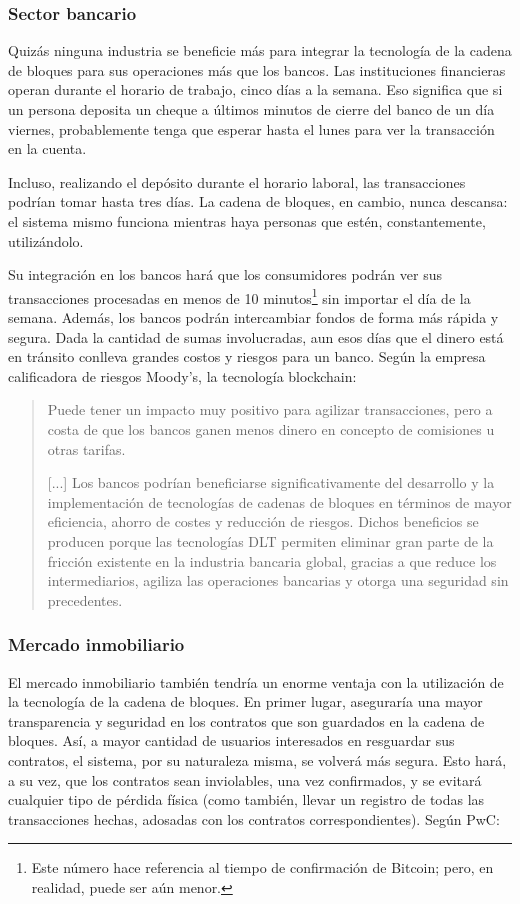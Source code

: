 \documentclass[12pt,a4paper,twoside]{book}
\begin{document}
\subsubsection{Sector bancario}
Quizás ninguna industria se beneficie más para integrar la tecnología de la cadena de bloques para sus operaciones más que los bancos. Las instituciones financieras operan durante el horario de trabajo, cinco días a la semana. Eso significa que si un persona deposita un cheque a últimos minutos de cierre del banco de un día viernes, probablemente tenga que esperar hasta el lunes para ver la transacción en la cuenta.

Incluso, realizando el depósito durante el horario laboral, las transacciones podrían tomar hasta tres días. La cadena de bloques, en cambio, nunca descansa: el sistema mismo funciona mientras haya personas que estén, constantemente, utilizándolo.

Su integración en los bancos hará que los consumidores podrán ver sus transacciones procesadas en menos de 10 minutos\footnote{Este número hace referencia al tiempo de confirmación de Bitcoin; pero, en realidad, puede ser aún menor.} sin importar el día de la semana. Además, los bancos podrán intercambiar fondos de forma más rápida y segura. Dada la cantidad de sumas involucradas, aun esos días que el dinero está en tránsito conlleva grandes costos y riesgos para un banco. Según la empresa calificadora de riesgos Moody's, la tecnología blockchain:

\begin{quotation}
Puede tener un impacto muy positivo para agilizar transacciones, pero a costa de que los bancos ganen menos dinero en concepto de comisiones u otras tarifas.

[...] Los bancos podrían beneficiarse significativamente del desarrollo y la implementación de tecnologías de cadenas de bloques en términos de mayor eficiencia, ahorro de costes y reducción de riesgos. Dichos beneficios se producen porque las tecnologías DLT permiten eliminar gran parte de la fricción existente en la industria bancaria global, gracias a que reduce los intermediarios, agiliza las operaciones bancarias y otorga una seguridad sin precedentes. \cite{blockchain:comisiones}
\end{quotation}

\subsubsection{Mercado inmobiliario}
El mercado inmobiliario también tendría un enorme ventaja con la utilización de la tecnología de la cadena de bloques. En primer lugar, aseguraría una mayor transparencia y seguridad en los contratos que son guardados en la cadena de bloques. Así, a mayor cantidad de usuarios interesados en resguardar sus contratos, el sistema, por su naturaleza misma, se volverá más segura. Esto hará, a su vez, que los contratos sean inviolables, una vez confirmados, y se evitará cualquier tipo de pérdida física (como también, llevar un registro de todas las transacciones hechas, adosadas con los contratos correspondientes). Según PwC:
\end{document}
